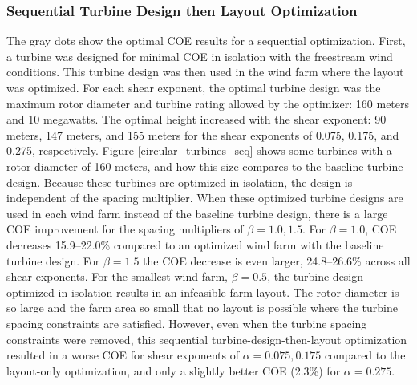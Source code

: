 \subsubsection{Sequential Turbine Design then Layout Optimization}
The gray dots show the optimal COE results for a sequential optimization. First, a turbine was designed for minimal COE in isolation with the freestream wind conditions. This turbine design was then used in the wind farm where the layout was optimized. For each shear exponent, the optimal turbine design was the maximum rotor diameter and turbine rating allowed by the optimizer: 160 meters and 10 megawatts. The optimal height increased with the shear exponent: 90 meters, 147 meters, and 155 meters for the shear exponents of 0.075, 0.175, and 0.275, respectively. Figure \ref{circular_turbines_seq} shows some turbines with a rotor diameter of 160 meters, and how this size compares to the baseline turbine design. Because these turbines are optimized in isolation, the design is independent of the spacing multiplier. When these optimized turbine designs are used in each wind farm instead of the baseline turbine design, there is a large COE improvement for the spacing multipliers of $\beta=1.0, 1.5$. For $\beta=1.0$, COE decreases 15.9--22.0\% compared to an optimized wind farm with the baseline turbine design. For $\beta=1.5$ the COE decrease is even larger, 24.8--26.6\% across all shear exponents. For the smallest wind farm, $\beta=0.5$, the turbine design optimized in isolation results in an infeasible farm layout. The rotor diameter is so large and the farm area so small that no layout is possible where the turbine spacing constraints are satisfied. However, even when the turbine spacing constraints were removed, this sequential turbine-design-then-layout optimization resulted in a worse COE for shear exponents of $\alpha=0.075,0.175$ compared to the layout-only optimization, and only a slightly better COE (2.3\%) for $\alpha=0.275$. 


